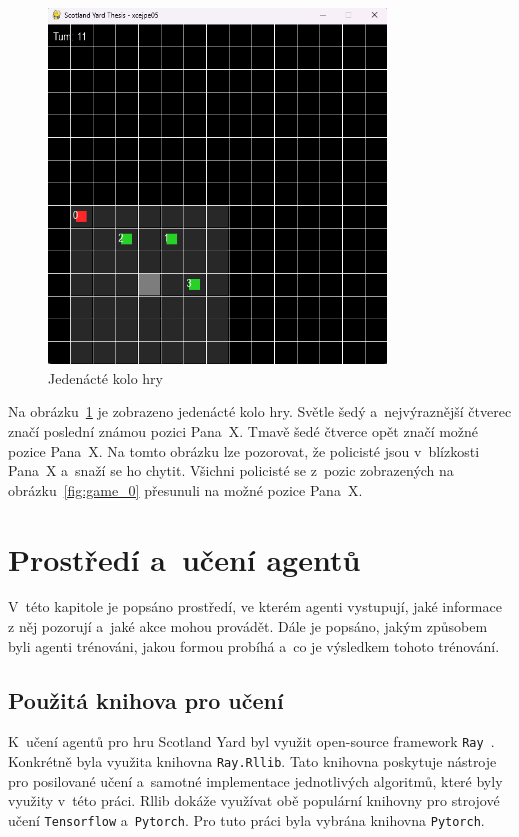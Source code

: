 \begin{figure}[H]
	\centering
	\includegraphics[width=0.8\textwidth]{obrazky-figures/game_11}
      \caption{Jedenácté kolo hry}
    \label{fig:game_11}
\end{figure}

Na obrázku~\ref{fig:game_11} je zobrazeno jedenácté kolo hry.
Světle šedý a~nejvýraznější čtverec značí poslední známou pozici Pana~X\@.
Tmavě šedé čtverce opět značí možné pozice Pana~X\@.
Na tomto obrázku lze pozorovat, že policisté jsou v~blízkosti Pana~X a~snaží se ho chytit.
Všichni policisté se z~pozic zobrazených na obrázku~\ref{fig:game_0} přesunuli na možné pozice Pana~X\@.

\section{Prostředí a~učení agentů}
\label{sec:implementace}

V~této kapitole je popsáno prostředí, ve kterém agenti vystupují, jaké informace z něj pozorují a~jaké akce mohou provádět.
Dále je popsáno, jakým způsobem byli agenti trénováni, jakou formou probíhá a~co je výsledkem tohoto trénování.


\subsection{Použitá knihova pro učení}\label{subsec:pouzite-technologie}
K~učení agentů pro hru Scotland Yard byl využit open-source framework \texttt{Ray}~\cite{Ray,liang2018rllib}.
Konkrétně byla využita knihovna \texttt{Ray.Rllib}.
Tato knihovna poskytuje nástroje pro posilované učení a~samotné implementace jednotlivých algoritmů, které byly využity v~této práci.
Rllib dokáže využívat obě populární knihovny pro strojové učení \texttt{Tensorflow} a~\texttt{Pytorch}.
Pro tuto práci byla vybrána knihovna \texttt{Pytorch}.


